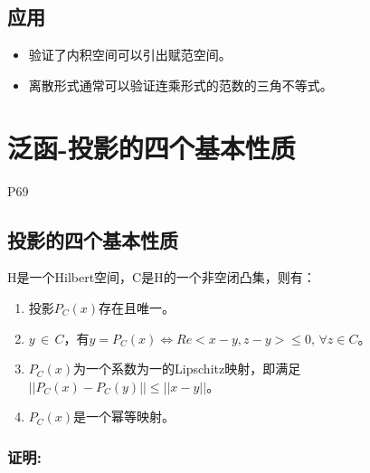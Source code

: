 \documentclass[
]{article}
\begin{document}
\hypertarget{ux5e94ux7528}{%
\subsection{应用}\label{ux5e94ux7528}}

\begin{itemize}
\item
  验证了内积空间可以引出赋范空间。
\item
  离散形式通常可以验证连乘形式的范数的三角不等式。
\end{itemize}

\hypertarget{ux6cdbux51fd-ux6295ux5f71ux7684ux56dbux4e2aux57faux672cux6027ux8d28}{%
\section{泛函-投影的四个基本性质}\label{ux6cdbux51fd-ux6295ux5f71ux7684ux56dbux4e2aux57faux672cux6027ux8d28}}

P69

\hypertarget{ux6295ux5f71ux7684ux56dbux4e2aux57faux672cux6027ux8d28}{%
\subsection{\texorpdfstring{\textbf{投影的四个基本性质}}{投影的四个基本性质}}\label{ux6295ux5f71ux7684ux56dbux4e2aux57faux672cux6027ux8d28}}

H是一个Hilbert空间，C是H的一个非空闭凸集，则有：

\begin{enumerate}
\def\labelenumi{\arabic{enumi}.}
\item
  投影\(P_{C}(x)\)存在且唯一。
\item
  \(y\, \in \, C\)，有\(y=P_{C}(x) \Leftrightarrow Re<x-y,z-y>\leq0 ,\, \forall z\in C\)。
\item
  \(P_{C}(x)\)为一个系数为一的Lipschitz映射，即满足\(||P_{C}(x)-P_{C}(y)||\leq ||x-y||\)。
\item
  \(P_{C}(x)\)是一个幂等映射。
\end{enumerate}

\hypertarget{ux8bc1ux660e-4}{%
\subsubsection{\texorpdfstring{\textbf{证明:}}{证明:}}\label{ux8bc1ux660e-4}}
\end{document}

